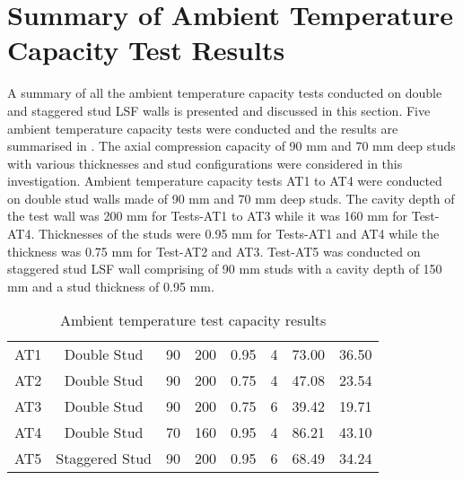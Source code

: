 \section{Summary of Ambient Temperature Capacity Test Results}

A summary of all the ambient temperature capacity tests conducted on double and staggered stud LSF walls is presented and discussed in this section. Five ambient temperature capacity tests were conducted and the results are summarised in . The axial compression capacity of 90 mm and 70 mm deep studs with various thicknesses and stud configurations were considered in this investigation. Ambient temperature capacity tests AT1 to AT4 were conducted on double stud walls made of 90 mm and 70 mm deep studs. The cavity depth of the test wall was 200 mm for Tests-AT1 to AT3 while it was 160 mm for Test-AT4. Thicknesses of the studs were 0.95 mm for Tests-AT1 and AT4 while the thickness was 0.75 mm for Test-AT2 and AT3. Test-AT5 was conducted on staggered stud LSF wall comprising of 90 mm studs with a cavity depth of 150 mm and a stud thickness of 0.95 mm.  
\begin{table}[!htbp]
	\centering
	\caption{Ambient temperature test capacity results}
	\begin{tabular}{cccccccc}
		\toprule
		\multicolumn{1}{m{2.25em}}{\centering{Test Name}} & 
		\multicolumn{1}{m{5.6em}}{\centering{Description}} & 
		\multicolumn{1}{m{2.8em}}{\centering{Stud Depth (mm)}} & 
		\multicolumn{1}{m{2.8em}}{\centering{Cavity Depth (mm)}} & 
		\multicolumn{1}{m{4.5em}}{\centering{Stud Thickness (mm)}} & 
		\multicolumn{1}{m{2.5em}}{\centering{No of Studs}} &
		\multicolumn{1}{m{2.6em}}{\centering{Failure Load (kN)}} &
		\multicolumn{1}{m{2.6em}}{\centering{Failure Load Per Stud (kN)}} \\
		\midrule
		AT1  & Double Stud & 90 & 200 & 0.95 & 4 & 73.00 & 36.50 \\
		AT2  & Double Stud & 90 & 200 & 0.75 & 4 & 47.08 & 23.54 \\
		AT3  & Double Stud & 90 & 200 & 0.75 & 6 & 39.42 & 19.71 \\
		AT4  & Double Stud & 70 & 160 & 0.95 & 4 & 86.21 & 43.10\\
		AT5  & Staggered Stud & 90 & 200 & 0.95 & 6 & 68.49 & 34.24\\
		\bottomrule
	\end{tabular}%
	\label{tab:ambient-test-results}%
\end{table}%

